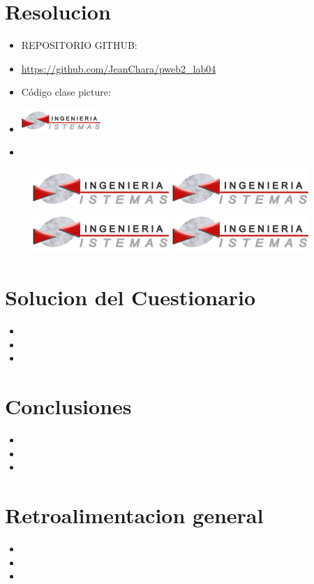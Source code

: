 \documentclass[]{article}
\newcommand{\foto}{\includegraphics[]{../img/logo_episunsa.png}}
\begin{document}
    \section{Resolucion}
    	\begin{itemize}		
    		\item REPOSITORIO GITHUB: 
            \item 
            \url{https://github.com/JeanChara/pweb2_lab04}
    		\item Código clase picture:
      \item 
      \includegraphics[width=3cm]{../img/logo_episunsa.png}
    		\item 
      \end{itemize}
      	\begin{figure}[H]
		\centering
		\foto
        \foto
        \foto
		\label{img:mot2}
    \includegraphics[]{../img/logo_episunsa.png}

	\end{figure}
    \section{Solucion del Cuestionario}
    	\begin{itemize}		
    		\item 
    		\item 
    		\item 
    	\end{itemize}
    \section{Conclusiones}
    	\begin{itemize}		
    		\item 
    		\item 
    		\item 
    	\end{itemize}
    \section{Retroalimentacion general}
    	\begin{itemize}		
    		\item 
    		\item 
    		\item 
    	\end{itemize}
\end{document}
